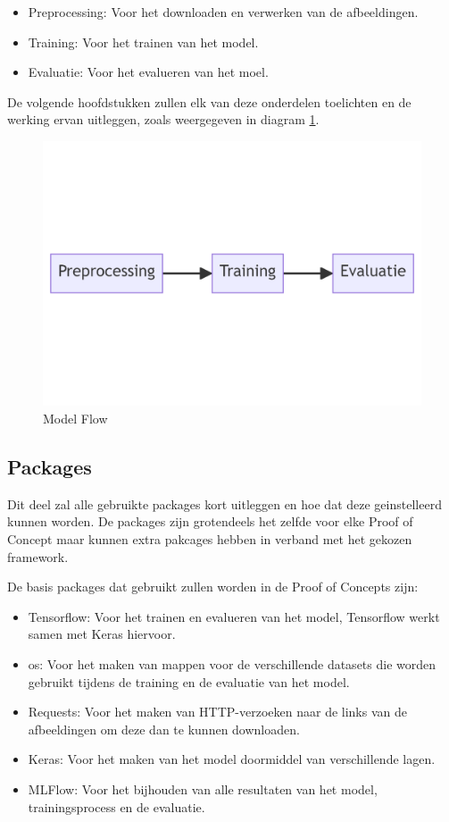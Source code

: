 \begin{itemize}
    \item Preprocessing: Voor het downloaden en verwerken van de afbeeldingen.
    \item Training: Voor het trainen van het model.
    \item Evaluatie: Voor het evalueren van het moel.
\end{itemize}

De volgende hoofdstukken zullen elk van deze onderdelen toelichten en de werking ervan uitleggen, zoals weergegeven in diagram \ref{fig:Model_Flow}.
\begin{figure}[]
    \includegraphics[width=\linewidth]{graphics/Model_Diagram.PNG}
    \caption{Model Flow}
    \label{fig:Model_Flow}
\end{figure}
\subsection{Packages}
Dit deel zal alle gebruikte packages kort uitleggen en hoe dat deze geinstelleerd kunnen worden. De packages zijn grotendeels het zelfde voor elke Proof of Concept maar kunnen extra pakcages hebben in verband met het gekozen framework.

De basis packages dat gebruikt zullen worden in de Proof of Concepts zijn:
\begin{itemize}
    \item Tensorflow: Voor het trainen en evalueren van het model, Tensorflow werkt samen met Keras hiervoor.
    \item os: Voor het maken van mappen voor de verschillende datasets die worden gebruikt tijdens de training en de evaluatie van het model.
    \item Requests: Voor het maken van HTTP-verzoeken naar de links van de afbeeldingen om deze dan te kunnen downloaden.
    \item Keras: Voor het maken van het model doormiddel van verschillende lagen.
    \item MLFlow: Voor het bijhouden van alle resultaten van het model, trainingsprocess en de evaluatie.
\end{itemize}

